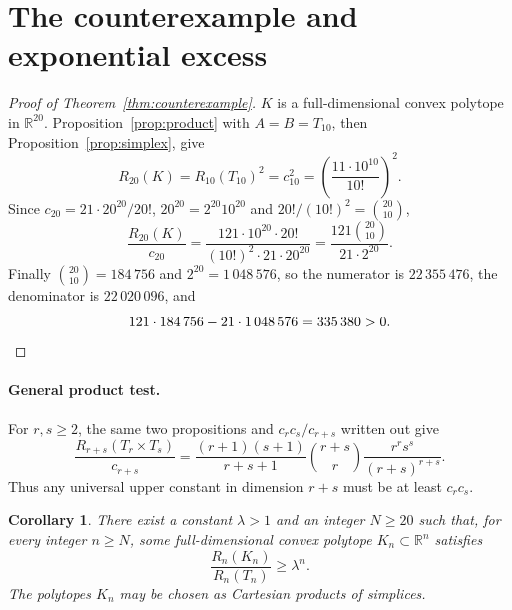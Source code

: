 \documentclass[11pt]{article}
\newtheorem{corollary}[theorem]{Corollary}
\newcommand{\R}{\mathbb R}
\begin{document}
\section{The counterexample and exponential excess}\label{sec:counterexample}

\begin{proof}[Proof of Theorem~\ref{thm:counterexample}]
\(K\) is a full-dimensional convex polytope in \(\R^{20}\). Proposition~\ref{prop:product} with \(A=B=T_{10}\), then Proposition~\ref{prop:simplex}, give
\[
 R_{20}(K)=R_{10}(T_{10})^2=c_{10}^2
         =\left(\frac{11\cdot10^{10}}{10!}\right)^2 .
\]
Since \(c_{20}=21\cdot20^{20}/20!\), \(20^{20}=2^{20}10^{20}\) and \(20!/(10!)^2=\binom{20}{10}\),
\[
 \frac{R_{20}(K)}{c_{20}}
 =\frac{121\cdot10^{20}\cdot20!}
        {(10!)^2\cdot21\cdot20^{20}}
 =\frac{121\binom{20}{10}}{21\cdot2^{20}} .
\]
Finally \(\binom{20}{10}=184\,756\) and \(2^{20}=1\,048\,576\), so the numerator is \(22\,355\,476\), the denominator is \(22\,020\,096\), and
\[
 121\cdot184\,756-21\cdot1\,048\,576=335\,380>0. \qedhere
\]
\end{proof}

\paragraph{General product test.} For \(r,s\ge2\), the same two propositions and \(c_rc_s/c_{r+s}\) written out give
\[
 \frac{R_{r+s}(T_r\times T_s)}{c_{r+s}}
 =\frac{(r+1)(s+1)}{r+s+1}
   \binom{r+s}{r}\frac{r^rs^s}{(r+s)^{r+s}}.
\]
Thus any universal upper constant in dimension \(r+s\) must be at least \(c_rc_s\).

\begin{corollary}\label{cor:exponential-excess}
There exist a constant \(\lambda>1\) and an integer \(N\ge20\) such that, for every
integer \(n\ge N\), some full-dimensional convex polytope
\(K_n\subset\R^n\) satisfies
\[
 \frac{R_n(K_n)}{R_n(T_n)}\ge\lambda^n.
\]
The polytopes \(K_n\) may be chosen as Cartesian products of simplices.
\end{corollary}
\end{document}
